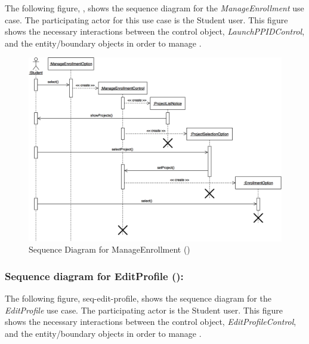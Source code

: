 \documentclass[12pt,letterpaper]{article}
\begin{document}
The following figure, , shows the sequence diagram for the {\it ManageEnrollment} use case. The participating actor for this use case
is the Student user. This figure shows the necessary interactions between the control object, {\it LaunchPPIDControl}, and the entity/boundary objects
in order to manage .
\begin{figure}[H]
	\centering{}
	\includegraphics[scale=0.27]{imgs/seq/manage-enrollment.png}
	\caption[ - Sequence Diagram for ManageEnrollment]{Sequence Diagram for ManageEnrollment ()}
\end{figure}

\newpage{}

\subsubsection*{Sequence diagram for EditProfile ():}

The following figure, {seq-edit-profile}, shows the sequence diagram for the {\it EditProfile} use case. The participating actor is the 
Student user. This figure shows the necessary interactions between the control object, {\it EditProfileControl}, and the entity/boundary objects
in order to manage .
\end{document}
